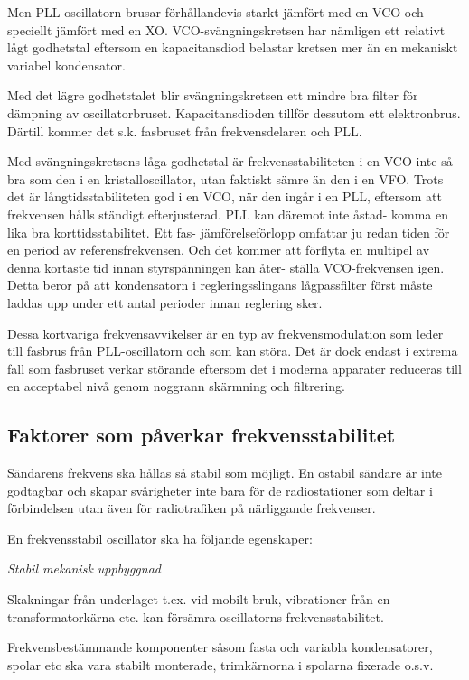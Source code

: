 Men PLL-oscillatorn brusar förhållandevis starkt jämfört med en VCO
och speciellt jämfört med en XO. VCO-svängningskretsen har nämligen
ett relativt lågt godhetstal eftersom en kapacitansdiod belastar
kretsen mer än en mekaniskt variabel kondensator.

Med det lägre godhetstalet blir svängningskretsen ett mindre bra
filter för dämpning av oscillatorbruset. Kapacitansdioden tillför
dessutom ett elektronbrus. Därtill kommer det s.k. fasbruset från
frekvensdelaren och PLL.

Med svängningskretsens låga godhetstal är frekvensstabiliteten i en
VCO inte så bra som den i en kristalloscillator, utan faktiskt sämre
än den i en VFO.  Trots det är långtidsstabiliteten god i en VCO,
när den ingår i en PLL, eftersom att frekvensen hålls ständigt
efterjusterad. PLL kan däremot inte åstad- komma en lika bra
korttidsstabilitet. Ett fas- jämförelseförlopp omfattar ju redan tiden
för en period av referensfrekvensen. Och det kommer att förflyta en
multipel av denna kortaste tid innan styrspänningen kan åter- ställa
VCO-frekvensen igen. Detta beror på att kondensatorn i
regleringsslingans lågpassfilter först måste laddas upp under ett
antal perioder innan reglering sker.

Dessa kortvariga frekvensavvikelser är en typ av frekvensmodulation
som leder till fasbrus från PLL-oscillatorn och som kan störa. Det är
dock endast i extrema fall som fasbruset verkar störande eftersom det
i moderna apparater reduceras till en acceptabel nivå genom noggrann
skärmning och filtrering.

\subsection{Faktorer som påverkar frekvensstabilitet}

Sändarens frekvens ska hållas så stabil som möjligt. En ostabil
sändare är inte godtagbar och skapar svårigheter inte bara för de
radiostationer som deltar i förbindelsen utan även för radiotrafiken
på närliggande frekvenser.

En frekvensstabil oscillator ska ha följande egenskaper:

\emph{Stabil mekanisk uppbyggnad}

Skakningar från underlaget t.ex. vid mobilt bruk, vibrationer från en
transformatorkärna etc. kan försämra oscillatorns frekvensstabilitet.

Frekvensbestämmande komponenter såsom fasta och variabla
kondensatorer, spolar etc ska vara stabilt monterade, trimkärnorna i
spolarna fixerade o.s.v.

